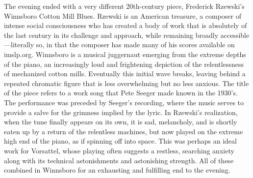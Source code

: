 The evening ended with a very different 20th-century piece, Frederick Rzewski’s Winnsboro Cotton Mill Blues. Rzewski is an American treasure, a composer of intense social consciousness who has created a body of work that is absolutely of the last century in its challenge and approach, while remaining broadly accessible—literally so, in that the composer has made many of his scores available on imslp.org. Winnsboro is a musical juggernaut emerging from the extreme depths of the piano, an increasingly loud and frightening depiction of the relentlessness of mechanized cotton mills. Eventually this initial wave breaks, leaving behind a repeated chromatic figure that is less overwhelming but no less anxious. The title of the piece refers to a work song that Pete Seeger made known in the 1930’s. The performance was preceded by Seeger’s recording, where the music serves to provide a salve for the grimness implied by the lyric. In Rzewski’s realization, when the tune finally appears on its own, it is sad, melancholy, and is shortly eaten up by a return of the relentless machines, but now played on the extreme high end of the piano, as if spinning off into space. This was perhaps an ideal work for Vorsattel, whose playing often suggests a restless, searching anxiety along with its technical astonishments and astonishing strength. All of these combined in Winnsboro for an exhausting and fulfilling end to the evening.
